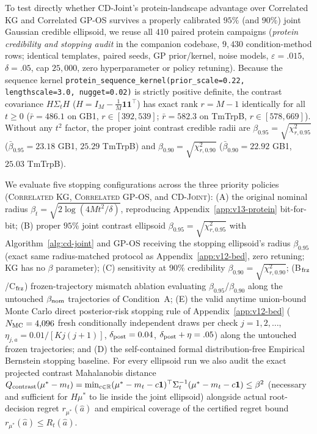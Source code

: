 \documentclass{article}
\theoremstyle{plain}
\theoremstyle{definition}
\begin{document}
To test directly whether CD-Joint's protein-landscape advantage over Correlated KG and Correlated GP-OS survives a properly calibrated $95\%$ (and $90\%$) joint Gaussian credible ellipsoid, we reuse all $410$ paired protein campaigns (\emph{protein credibility and stopping audit} in the companion codebase, $9{,}430$ condition-method rows; identical templates, paired seeds, GP prior/kernel, noise models, $\varepsilon=.015$, $\delta=.05$, cap $25{,}000$, zero hyperparameter or policy retuning). Because the sequence kernel \texttt{protein\_sequence\_kernel(prior\_scale=0.22, lengthscale=3.0, nugget=0.02)} is strictly positive definite, the contrast covariance $H\Sigma_t H$ ($H=I_M-\frac{1}{M}\mathbf{1}\mathbf{1}^\top$) has exact rank $r=M-1$ identically for all $t\ge 0$ ($\bar r=486.1$ on GB1, $r\in[392,539]$; $\bar r=582.3$ on TmTrpB, $r\in[578,669]$). Without any $t^2$ factor, the proper joint contrast credible radii are $\beta_{0.95}=\sqrt{\chi^2_{r,0.95}}$ ($\bar\beta_{0.95}=23.18$ GB1, $25.29$ TmTrpB) and $\beta_{0.90}=\sqrt{\chi^2_{r,0.90}}$ ($\bar\beta_{0.90}=22.92$ GB1, $25.03$ TmTrpB).

We evaluate five stopping configurations across the three priority policies (\textsc{Correlated KG}, \textsc{Correlated GP-OS}, and \textsc{CD-Joint}): (A) the original nominal radius $\beta_t=\sqrt{2\log(4Mt^2/\delta)}$, reproducing Appendix~\ref{app:v13-protein} bit-for-bit; (B) proper $95\%$ joint contrast ellipsoid $\beta_{0.95}=\sqrt{\chi^2_{r,0.95}}$ with Algorithm~\ref{alg:cd-joint} and GP-OS receiving the stopping ellipsoid's radius $\beta_{0.95}$ (exact same radius-matched protocol as Appendix~\ref{app:v12-bed}, zero retuning; KG has no $\beta$ parameter); (C) sensitivity at $90\%$ credibility $\beta_{0.90}=\sqrt{\chi^2_{r,0.90}}$; (B$_{\rm frz}$/C$_{\rm frz}$) frozen-trajectory mismatch ablation evaluating $\beta_{0.95}$/$\beta_{0.90}$ along the untouched $\beta_{\rm nom}$ trajectories of Condition~A; (E) the valid anytime union-bound Monte Carlo direct posterior-risk stopping rule of Appendix~\ref{app:v12-bed} ($N_{\rm MC}=4{,}096$ fresh conditionally independent draws per check $j=1,2,\dots$, $\eta_{j,a}=0.01/[Kj(j+1)]$, $\delta_{\rm post}=0.04$, $\delta_{\rm post}+\eta=.05$) along the untouched frozen trajectories; and (D) the self-contained formal distribution-free Empirical Bernstein stopping baseline. For every ellipsoid run we also audit the exact projected contrast Mahalanobis distance $Q_{\rm contrast}(\mu^*-m_t)=\min_{c\in\mathbb R}(\mu^*-m_t-c\mathbf{1})^\top\Sigma_t^{-1}(\mu^*-m_t-c\mathbf{1})\le\beta^2$ (necessary and sufficient for $H\mu^*$ to lie inside the joint ellipsoid) alongside actual root-decision regret $r_{\mu^*}(\hat a)$ and empirical coverage of the certified regret bound $r_{\mu^*}(\hat a)\le R_t(\hat a)$.
\end{document}
